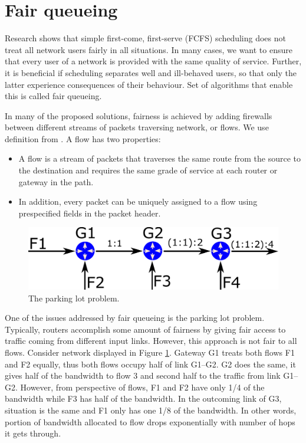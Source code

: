 \section{Fair queueing}

Research shows that simple first-come, first-serve (FCFS) scheduling does not treat all network users fairly in all situations. In many cases, we want to ensure that every user of a network is provided with the same quality of service. Further, it is beneficial if scheduling separates well and ill-behaved users, so that only the latter experience consequences of their behaviour. Set of algorithms that enable this is called fair queueing.

In many of the proposed solutions, fairness is achieved by adding firewalls between different streams of packets traversing network, or flows. We use definition from \cite{Zhang:1990:VCN:99517.99525}. A flow has two properties:
\begin{itemize}
	\item A flow is a stream of packets that traverses the same route from the source to the destination and requires the same grade of service at each router or gateway in the path.
	\item In addition, every packet can be uniquely assigned to a flow using prespecified fields in the packet header.
\end{itemize}
 
\begin{figure}
	\centering
	\includegraphics[width=137mm]{drawings/parking_lot}
	\caption{The parking lot problem.}
	
	\label{fig05:ParkingLot}
\end{figure}

One of the issues addressed by fair queueing is the parking lot problem. Typically, routers accomplish some amount of fairness by giving fair access to traffic coming from different input links. However, this approach is not fair to all flows. Consider network displayed in Figure \ref{fig05:ParkingLot}. Gateway G1 treats both flows F1 and F2 equally, thus both flows occupy half of link G1--G2. G2 does the same, it gives half of the bandwidth to flow 3 and second half to the traffic from link G1--G2. However, from perspective of flows, F1 and F2 have only 1/4 of the bandwidth while F3 has half of the bandwidth. In the outcoming link of G3, situation is the same and F1 only has one 1/8 of the bandwidth. In other words, portion of bandwidth allocated to flow drops exponentially with number of hops it gets through.

